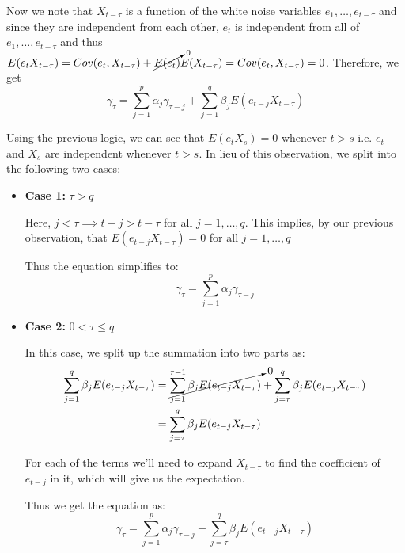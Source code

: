\documentclass[12pt, oneside]{article}
\begin{document}
\begin{enumerate}
{    Now we note that \(X_{t-\tau}\) is a function of the white noise variables \(e_1,\ldots,e_{t-\tau}\) and since
    they are independent from each other, \(e_t\) is independent from all of \(e_1,\ldots,e_{t-\tau}\) and thus \(E(e_t X_{t-\tau}) = Cov(e_t, X_{t-\tau}) + \cancelto{0}{E(e_t)} E(X_{t-\tau}) = Cov(e_t, X_{t-\tau}) = 0\).
    Therefore, we get
    \begin{equation}
        \gamma_{\tau} = \sum_{j=1}^{p}\alpha_j \gamma_{\tau - j} + \sum_{j=1}^{q} \beta_j E\left(e_{t-j} X_{t-\tau}\right) \label{eq:q6:arma_var}
    \end{equation}

    Using the previous logic, we can see that \(E(e_t X_s) = 0\) whenever \(t > s\) i.e. \(e_t\) and \(X_s\) are
    independent whenever \(t > s\). In lieu of this observation, we split into the following two cases:

    \renewcommand{\labelitemi}{\textendash}
    \begin{itemize}
        \item \textbf{Case 1: } \(\tau > q\)
        
        Here, \(j < \tau \implies t - j > t - \tau\) for all \(j = 1, \ldots, q\). This implies, by our previous observation,
        that \(E(e_{t-j} X_{t-\tau}) = 0\) for all \(j = 1,\ldots,q\)

        Thus the equation simplifies to:
        \begin{equation}
            \gamma_{\tau} = \sum_{j=1}^{p}\alpha_j \gamma_{\tau - j} \label{eq:q6:case1}
        \end{equation}

        \item \textbf{Case 2: } \(0 < \tau \leq q\)
        
        In this case, we split up the summation into two parts as:
        \begin{align*}
            \sum_{j=1}^{q} \beta_j E(e_{t-j} X_{t-\tau}) &= \cancelto{0}{\sum_{j=1}^{\tau - 1} \beta_j E(e_{t-j} X_{t-\tau})} + \sum_{j=\tau}^{q} \beta_j E(e_{t-j} X_{t-\tau}) \\
                &= \sum_{j=\tau}^{q} \beta_j E(e_{t-j} X_{t-\tau})
        \end{align*}

        For each of the terms we'll need to expand \(X_{t-\tau}\) to find the coefficient
        of \(e_{t-j}\) in it, which will give us the expectation.

        Thus we get the equation as:
        \begin{equation}
            \gamma_{\tau} = \sum_{j=1}^{p}\alpha_j \gamma_{\tau - j} + \sum_{j=\tau}^{q} \beta_j E(e_{t-j} X_{t-\tau})
                \label{eq:q6:case2}
        \end{equation}
    \end{itemize}

}
\end{enumerate}
\end{document}
